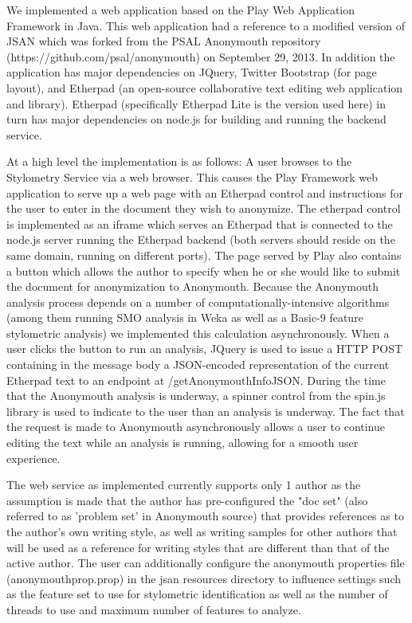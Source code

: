 \documentclass[letterpaper]{article}
\begin{document}
We implemented a web application based on the Play Web Application
Framework in Java. This web application had a reference to a modified
version of JSAN which was forked from the PSAL Anonymouth repository
(https://github.com/psal/anonymouth) on September 29, 2013. In
addition the application has major dependencies on JQuery, Twitter
Bootstrap (for page layout), and Etherpad  (an open-source collaborative text editing
web application and library). Etherpad (specifically Etherpad Lite is
the version used here) in turn has major dependencies on
node.js for building and running the backend service.

At a high level the implementation is as follows: A user browses to
the Stylometry Service via a web browser. This causes the Play
Framework web application to serve up a web page with an Etherpad control
and instructions for the user to enter in the document they wish to
anonymize. The etherpad control is implemented as an iframe which
serves an Etherpad that is connected to the node.js server running the
Etherpad backend (both servers should reside on the same domain,
running on different ports). The page served by Play also contains a
button which allows the author to specify when he or she would like to
submit the document for anonymization to Anonymouth. Because the
Anonymouth analysis process depends on a number of
computationally-intensive algorithms (among them running SMO analysis
in Weka as well as a Basic-9 feature stylometric analysis) we
implemented this calculation asynchronously. When a user clicks the
button to run an analysis, JQuery is used to issue a HTTP POST
containing in the message body a JSON-encoded
representation of the current Etherpad text to an endpoint at
/getAnonymouthInfoJSON. During the time that the Anonymouth analysis
is underway, a spinner control from the spin.js library is used to
indicate to the user than an analysis is underway. The fact that the
request is made to Anonymouth asynchronously allows a user to continue
editing the text while an analysis is running, allowing for a smooth
user experience.

The web service as implemented currently supports only 1 author as the assumption is
made that the author has pre-configured the "doc set" (also referred
to as 'problem set' in Anonymouth source) that provides references as
to the author's own writing style, as well as writing samples for
other authors that will be used as a reference for writing styles that
are different than that of the active author. The user can
additionally configure the anonymouth properties file
(anonymouthprop.prop) in the jsan resources directory to influence
settings such as the feature set to use for stylometric identification
as well as the number of threads to use and maximum number of features
to analyze.
\end{document}

